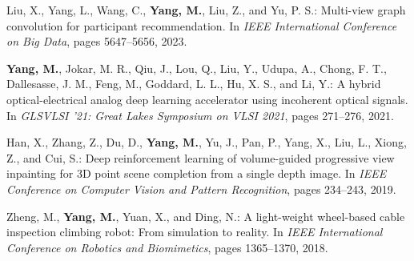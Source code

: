 \begin{list}{}
\item[] Liu, X., Yang, L., Wang, C., \textbf{Yang, M.}, Liu, Z., and Yu, P. S.: Multi-view graph convolution for participant recommendation. In \textit{IEEE International Conference on Big Data}, pages 5647--5656, 2023.

\item[] \textbf{Yang, M.}, Jokar, M. R., Qiu, J., Lou, Q., Liu, Y., Udupa, A., Chong, F. T., Dallesasse, J. M., Feng, M., Goddard, L. L., Hu, X. S., and Li, Y.: A hybrid optical-electrical analog deep learning accelerator using incoherent optical signals. In \textit{GLSVLSI '21: Great Lakes Symposium on VLSI 2021}, pages 271--276, 2021.

\item[] Han, X., Zhang, Z., Du, D., \textbf{Yang, M.}, Yu, J., Pan, P., Yang, X., Liu, L., Xiong, Z., and Cui, S.: Deep reinforcement learning of volume-guided progressive view inpainting for 3D point scene completion from a single depth image. In \textit{IEEE Conference on Computer Vision and Pattern Recognition}, pages 234--243, 2019.

\item[] Zheng, M., \textbf{Yang, M.}, Yuan, X., and Ding, N.: A light-weight wheel-based cable inspection climbing robot: From simulation to reality. In \textit{IEEE International Conference on Robotics and Biomimetics}, pages 1365--1370, 2018.

\end{list}
